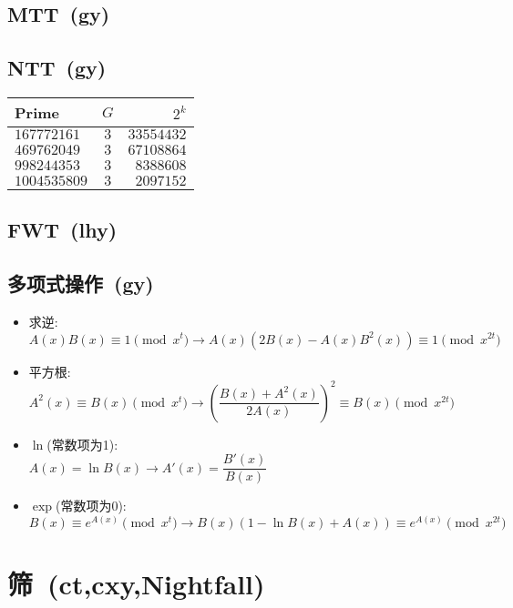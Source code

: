     \subsection*{MTT~\small(gy)}
    \subsection*{NTT~\small(gy)}
        \begin{tabular}{l c r}
            \hline
            Prime & $ G $ & $ 2^k $\\\hline
            $ 167772161 $ & $ 3 $ & $ 33554432 $\\\hline
            $ 469762049 $ & $ 3 $ & $ 67108864 $\\\hline
            $ 998244353 $ & $ 3 $ & $ 8388608 $\\\hline
            $ 1004535809 $ & $ 3 $ & $ 2097152 $\\\hline
        \end{tabular}
    \subsection*{FWT~\small(lhy)}
    \subsection*{多项式操作~\small(gy)}
        \begin{itemize}[wide=0pt]
            \item 求逆:
            \\$ A(x) B(x) \equiv 1 \pmod{x^t} \to A(x) (2B(x) - A(x) B^2(x)) \equiv 1 \pmod{x^{2t}} $
            \item 平方根:
            \\$ A^2(x) \equiv B(x) \pmod{x^t} \to (\dfrac{B(x) + A^2(x)}{2A(x)})^2 \equiv B(x) \pmod{x^{2t}} $
            \item $ \ln $(常数项为1):
            \\$ A(x) = \ln B(x) \to A'(x) = \dfrac{B'(x)}{B(x)} $
            \item $ \exp $(常数项为0):
            \\$ B(x) \equiv e^{A(x)} \pmod{x^t} \to B(x) (1 - \ln B(x) + A(x)) \equiv e^{A(x)} \pmod{x^{2t}} $
        \end{itemize}

\section{筛~\small(ct,cxy,Nightfall)}


